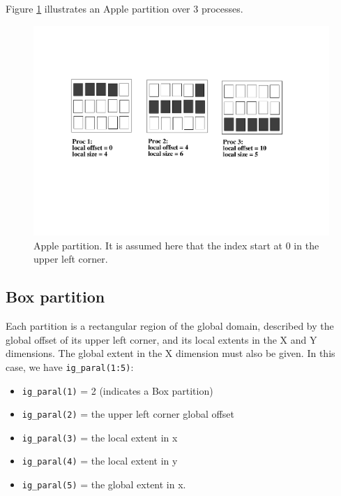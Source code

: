 Figure \ref{apple_partition} illustrates an Apple partition over 3
processes. 
\begin{figure}
\includegraphics[scale=.6]{figures/apple_new} 
\caption{Apple partition. It is assumed here that the index start at 0 in the upper left corner.}
\label{apple_partition}
\end{figure}


\subsection{Box partition} 

Each partition is a rectangular region of the global domain, described
by the global offset of its upper left corner, and its local extents in the
X and Y dimensions. The global extent in the X dimension must also be
given. In this case, we have {\tt ig\_paral(1:5)}:
\begin{itemize}
 \item {\tt ig\_paral(1)} = 2 (indicates a Box partition)
 \item {\tt ig\_paral(2)} = the upper left corner global offset
 \item {\tt ig\_paral(3)} = the local extent in x
 \item {\tt ig\_paral(4)} = the local extent in y
 \item {\tt ig\_paral(5)} = the global extent in x.
\end{itemize}

